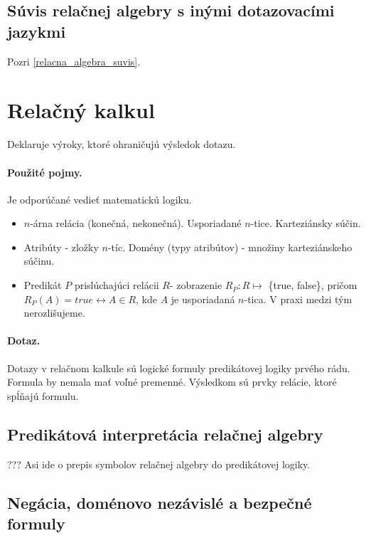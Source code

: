 \documentclass[10pt,a4paper]{article}
\begin{document}
\subsection{Súvis relačnej algebry s inými dotazovacími jazykmi}
Pozri \ref{relacna_algebra_suvis}.

\section{Relačný kalkul}
\label{relacny_kalkul}

Deklaruje výroky, ktoré ohraničujú výsledok dotazu.
\paragraph{Použité pojmy.}
Je odporúčané vedieť matematickú logiku.

\begin{itemize}
\item $n$-árna relácia (konečná, nekonečná). Usporiadané $n$-tice. Karteziánsky súčin.
\item Atribúty - zložky $n$-tíc. Domény (typy atribútov) - množiny karteziánskeho súčinu.
\item Predikát $P$ prislúchajúci relácii $R$- zobrazenie $R_P : R \mapsto$ \{true, false\}, pričom $R_P(A) = true \leftrightarrow A \in R$, kde $A$ je usporiadaná $n$-tica. V praxi medzi tým nerozlišujeme.
\end{itemize}

\paragraph{Dotaz.}
Dotazy v relačnom kalkule sú logické formuly predikátovej logiky prvého rádu.
Formula by nemala mať voľné premenné. Výsledkom sú prvky relácie, ktoré spĺňajú formulu.

\subsection{Predikátová interpretácia relačnej algebry}
??? Asi ide o prepis symbolov relačnej algebry do predikátovej logiky.

\subsection{Negácia, doménovo nezávislé a bezpečné formuly}
\end{document}
